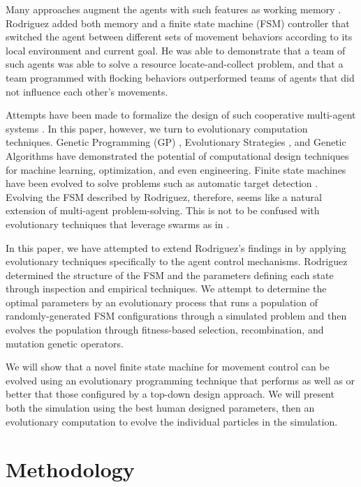 \documentclass[12pt,journal,compsoc]{IEEEtran}
\begin{document}
Many approaches augment the agents with such features as working memory \cite{winder2012role,hu2003particle}. Rodriguez \cite{rodriguez2004extending} added both memory and a finite state machine (FSM) controller that switched the agent between different sets of movement behaviors according to its local environment and current goal. He was able to demonstrate that a team of such agents was able to solve a resource locate-and-collect problem, and that a team programmed with flocking behaviors outperformed teams of agents that did not influence each other's movements.

Attempts have been made to formalize the design of such cooperative multi-agent systems \cite{mataric1993designing,capera2003amas}. In this paper, however, we turn to evolutionary computation techniques. Genetic Programming (GP) \cite{koza1992genetic}, Evolutionary Strategies \cite{rechenberg1989evolution}, and Genetic Algorithms \cite{goldberg1988genetic} have demonstrated the potential of computational design techniques for machine learning, optimization, and even engineering. Finite state machines have been evolved to solve problems such as automatic target detection \cite{benson2000evolving}. Evolving the FSM described by Rodriguez, therefore, seems like a natural extension of multi-agent problem-solving. This is not to be confused with evolutionary techniques that leverage swarms as in \cite{wei2002swarm,miranda2005evolutionary}.

In this paper, we have attempted to extend Rodriguez's findings in \cite{rodriguez2004extending} by applying evolutionary techniques specifically to the agent control mechanisms. Rodriguez determined the structure of the FSM and the parameters defining each state through inspection and empirical techniques. We attempt to determine the optimal parameters by an evolutionary process that runs a population of randomly-generated FSM configurations through a simulated problem and then evolves the population through fitness-based selection, recombination, and mutation genetic operators.

We will show that a novel finite state machine for movement control can be evolved using an evolutionary programming technique that performs as well as or better that those configured by a top-down design approach. We will present both the simulation using the best human designed parameters, then an evolutionary computation to evolve the individual particles in the simulation.

\section{Methodology}
\end{document}
